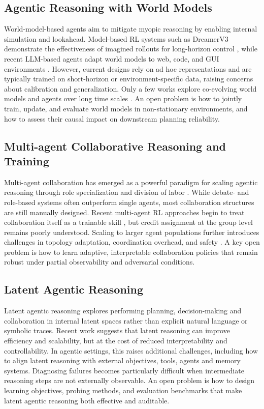 \subsection{Agentic Reasoning with World Models}
World-model-based agents \cite{carbonneaux2025cwm, zhang2025agent2} aim to mitigate myopic reasoning by enabling internal simulation and lookahead. Model-based RL systems such as DreamerV3 demonstrate the effectiveness of imagined rollouts for long-horizon control \citep{hafner2023mastering}, while recent LLM-based agents adapt world models to web, code, and GUI environments \citep{tang2024worldcoder,carbonneaux2025cwm,chae2024web,luo2025vimo}. However, current designs rely on ad hoc representations and are typically trained on short-horizon or environment-specific data, raising concerns about calibration and generalization. Only a few works explore co-evolving world models and agents over long time scales \citep{fang2025webevolver,deng2025simura}. An open problem is how to jointly train, update, and evaluate world models in non-stationary environments, and how to assess their causal impact on downstream planning reliability.

\subsection{Multi-agent Collaborative Reasoning and Training}
Multi-agent collaboration has emerged as a powerful paradigm for scaling agentic reasoning through role specialization and division of labor \citep{li2023camel,chen2023agentverse,wu2024autogen}. While debate- and role-based systems often outperform single agents, most collaboration structures are still manually designed. Recent multi-agent RL approaches begin to treat collaboration itself as a trainable skill \citep{liu2025llm,park2025maporl,ma2024coevolving}, but credit assignment at the group level remains poorly understood. Scaling to larger agent populations further introduces challenges in topology adaptation, coordination overhead, and safety \citep{qian2024scaling,florian2025agentsnet, zhang2024knowledge}. A key open problem is how to learn adaptive, interpretable collaboration policies that remain robust under partial observability and adversarial conditions.


\subsection{Latent Agentic Reasoning}
Latent agentic reasoning \cite{du2025enabling,fu2025cache,latentmas} explores performing planning, decision-making and collaboration in internal latent spaces rather than explicit natural language or symbolic traces. Recent work suggests that latent reasoning can improve efficiency and scalability, but at the cost of reduced interpretability and controllability. In agentic settings, this raises additional challenges, including how to align latent reasoning with external objectives, tools, agents and memory systems. Diagnosing failures becomes particularly difficult when intermediate reasoning steps are not externally observable. An open problem is how to design learning objectives, probing methods, and evaluation benchmarks that make latent agentic reasoning both effective and auditable.


